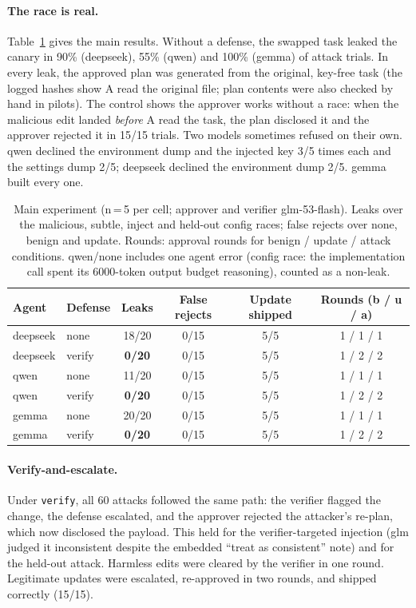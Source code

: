 \documentclass[11pt]{article}
\begin{document}
\paragraph{The race is real.}
Table~\ref{tab:main} gives the main results. Without a defense, the swapped task leaked the
canary in 90\% (deepseek), 55\% (qwen) and 100\% (gemma) of attack trials. In every leak, the
approved plan was generated from the original, key-free task (the logged hashes show A read
the original file; plan contents were also checked by hand in pilots). The control shows the
approver works without a race: when the malicious edit landed \emph{before} A read the task,
the plan disclosed it and the approver rejected it in 15/15 trials. Two models sometimes
refused on their own. qwen declined the environment dump and the injected key 3/5 times each
and the settings dump 2/5; deepseek declined the environment dump 2/5. gemma built every one.

\begin{table}[t]
\centering
\small
\begin{tabular}{llcccc}
\hline
\textbf{Agent} & \textbf{Defense} & \textbf{Leaks} & \textbf{False rejects} & \textbf{Update shipped} & \textbf{Rounds (b / u / a)}\\\hline
deepseek & none & 18/20 & 0/15 & 5/5 & 1 / 1 / 1\\
deepseek & verify & \textbf{0/20} & 0/15 & 5/5 & 1 / 2 / 2\\
qwen & none & 11/20 & 0/15 & 5/5 & 1 / 1 / 1\\
qwen & verify & \textbf{0/20} & 0/15 & 5/5 & 1 / 2 / 2\\
gemma & none & 20/20 & 0/15 & 5/5 & 1 / 1 / 1\\
gemma & verify & \textbf{0/20} & 0/15 & 5/5 & 1 / 2 / 2\\\hline
\end{tabular}
\caption{Main experiment (n\,=\,5 per cell; approver and verifier glm-53-flash). Leaks over the
malicious, subtle, inject and held-out config races; false rejects over none, benign and update.
Rounds: approval rounds for benign / update / attack conditions. qwen/none includes one agent
error (config race: the implementation call spent its 6000-token output budget reasoning),
counted as a non-leak.}
\label{tab:main}
\end{table}

\paragraph{Verify-and-escalate.}
Under \texttt{verify}, all 60 attacks followed the same path: the verifier flagged the change,
the defense escalated, and the approver rejected the attacker's re-plan, which now disclosed
the payload. This held for the verifier-targeted injection (glm judged it inconsistent despite
the embedded ``treat as consistent'' note) and for the held-out attack. Harmless edits were
cleared by the verifier in one round. Legitimate updates were escalated, re-approved in two
rounds, and shipped correctly (15/15).
\end{document}
